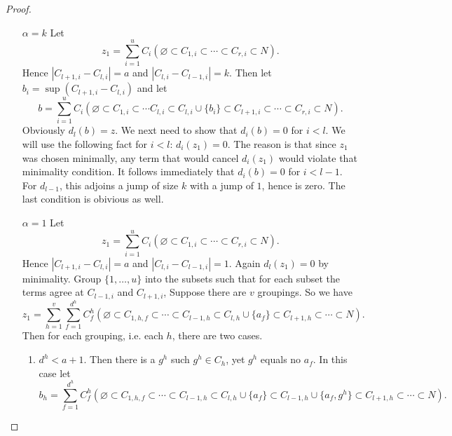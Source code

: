\documentclass{amsart}
\begin{document}
\begin{proof}
\begin{enumerate}
     \item[$\alpha=k$]
        Let $$z_1 = \sum_{i=1}^u C_i (\varnothing \subset C_{1,i} \subset \cdots \subset C_{r,i} \subset 
        N).$$ Hence  
        $|C_{l+1, i} - C_{l, i}| = a$ and $|C_{l, i} - C_{l-1, i}| = k$.  Then let 
        $b_i = \sup(C_{l+1,i}-C_{l, i})$ and let $$b = \sum_{i=1}^u C_i (\varnothing \subset C_{1,i} \subset \cdots C_{l,i} 
        \subset C_{l,i} \cup \{b_i\} \subset C_{l+1, i} \subset \cdots \subset C_{r,i} \subset 
        N).$$ Obviously $d_l(b) = z$. We next need to show that $d_i(b)=0$
        for $i < l$. We will use the following fact for $i< l$: $d_i(z_1)=0.$ The reason is that since $z_1$ was chosen 
        minimally, any term that would cancel $d_i(z_1)$ would violate that minimality condition. It follows immediately  
        that $d_i(b)=0$ for $i < l-1$. For $d_{l-1}$, this adjoins a jump of size $k$ with a jump of $1$, hence is zero.
        The last condition is obivious as well.
      \item[$\alpha=1$] Let $$z_1 = \sum_{i=1}^u C_i (\varnothing \subset C_{1,i} \subset \cdots \subset C_{r,i} \subset 
        N).$$  Hence  
        $|C_{l+1, i} - C_{l, i}| = a$ and $|C_{l, i} - C_{l-1, i}| = 1$. 
        Again $d_l(z_1)=0$ by minimality. Group $\{1, \ldots, u
        \}$ into the subsets such that for each subset the terms agree at $C_{l-1, i}$ and $C_{l+1, i}$,  
        Suppose there are $v$ groupings. 
        So we have
	  $$z_1 = \sum_{h=1}^v \sum_{f=1}^{d^h} C^h_f (\varnothing \subset C_{1, h, f} \subset \cdots \subset C_{l-1, h} 
        \subset
	  C_{l, h} 
       \cup \{ a_f\} \subset C_{l+1, h} \subset \cdots \subset N).$$ Then for each grouping, i.e. each $h$,  
       there are two cases.
	  \begin{enumerate}
 	  \item $d^h < a+1$. Then there is a $g^h$ such $g^h \in C_h$, yet $g^h$ equals no $a_f$. In this case let
	    $$b_h = \sum_{f=1}^{d^h} C^h_f (\varnothing \subset C_{1, h, f} \subset \cdots \subset C_{l-1, h} 
	    \subset C_{l, h} \cup \{a_f\} \subset C_{l-1, h} \cup  \{a_f, g^h\} 
          \subset C_{l+1, h} \subset \cdots \subset N).$$ 
	    

\end{enumerate}
\end{enumerate}
\end{proof}
\end{document}
